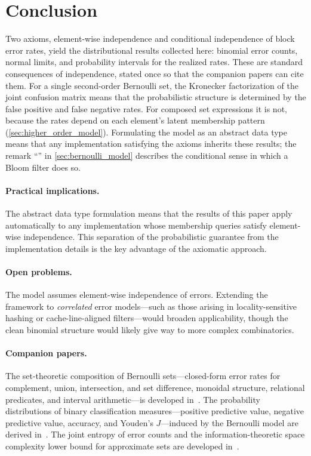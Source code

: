 
\section{Conclusion}
\label{sec:conclusion}

Two axioms, element-wise independence and conditional independence of block error rates, yield the distributional results collected here: binomial error counts, normal limits, and probability intervals for the realized rates.
These are standard consequences of independence, stated once so that the companion papers can cite them.
For a single second-order Bernoulli set, the Kronecker factorization of the joint confusion matrix means that the probabilistic structure is determined by the false positive and false negative rates.
For composed set expressions it is not, because the rates depend on each element's latent membership pattern (\cref{sec:higher_order_model}).
Formulating the model as an abstract data type means that any implementation satisfying the axioms inherits these results; the remark ``'' in \cref{sec:bernoulli_model} describes the conditional sense in which a Bloom filter does so.

\paragraph{Practical implications.}
The abstract data type formulation means that the results of this paper apply automatically to any implementation whose membership queries satisfy element-wise independence.
This separation of the probabilistic guarantee from the implementation details is the key advantage of the axiomatic approach.

\paragraph{Open problems.}
The model assumes element-wise independence of errors.
Extending the framework to \emph{correlated} error models---such as those arising in locality-sensitive hashing or cache-line-aligned filters---would broaden applicability, though the clean binomial structure would likely give way to more complex combinatorics.

\paragraph{Companion papers.}
The set-theoretic composition of Bernoulli sets---closed-form error rates for complement, union, intersection, and set difference, monoidal structure, relational predicates, and interval arithmetic---is developed in~\cite{bernoulliComposition}.
The probability distributions of binary classification measures---positive predictive value, negative predictive value, accuracy, and Youden's $J$---induced by the Bernoulli model are derived in~\cite{bernoulliMeasures}.
The joint entropy of error counts and the information-theoretic space complexity lower bound for approximate sets are developed in~\cite{bernoulliEntropy}.


